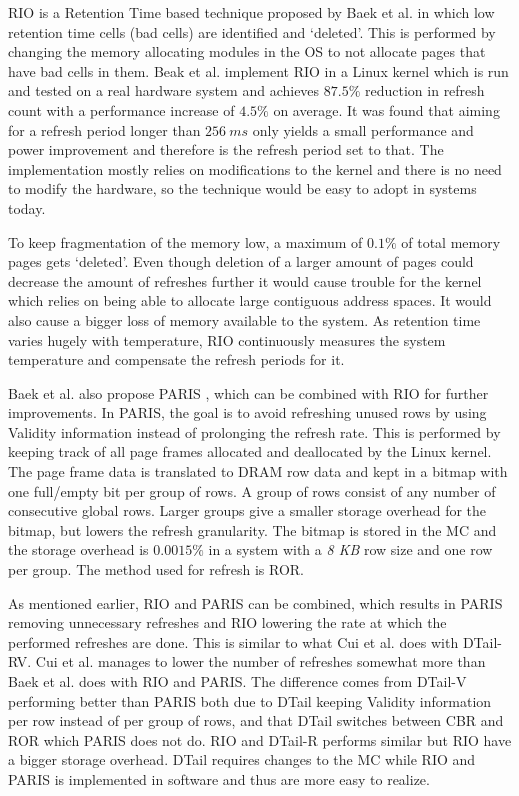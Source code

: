 RIO is a Retention Time based technique proposed by Baek et al. \cite{rioparis} in which low retention time cells (bad cells) are identified and `deleted'. This is performed by changing the memory allocating modules in the OS to not allocate pages that have bad cells in them. Beak et al. implement RIO in a Linux kernel which is run and tested on a real hardware system and achieves $87.5\%$ reduction in refresh count with a performance increase of $4.5\%$ on average. It was found that aiming for a refresh period longer than $256~ms$ only yields a small performance and power improvement and therefore is the refresh period set to that. The implementation mostly relies on modifications to the kernel and there is no need to modify the hardware, so the technique would be easy to adopt in systems today. 

To keep fragmentation of the memory low, a maximum of $0.1\%$ of total memory pages gets `deleted'. Even though deletion of a larger amount of pages could decrease the amount of refreshes further it would cause trouble for the kernel which relies on being able to allocate large contiguous address spaces. It would also cause a bigger loss of memory available to the system. As retention time varies hugely with temperature, RIO continuously measures the system temperature and compensate the refresh periods for it. 

Baek et al. also propose PARIS \cite{rioparis}, which can be combined with RIO for further improvements. In PARIS, the goal is to avoid refreshing unused rows by using Validity information instead of prolonging the refresh rate. This is performed by keeping track of all page frames allocated and deallocated by the Linux kernel. The page frame data is translated to DRAM row data and kept in a bitmap with one full/empty bit per group of rows. A group of rows consist of any number of consecutive global rows. Larger groups give a smaller storage overhead for the bitmap, but lowers the refresh granularity. The bitmap is stored in the MC and the storage overhead is $0.0015\%$ in a system with a \textit{8 KB} row size and one row per group. The method used for refresh is ROR. 

As mentioned earlier, RIO and PARIS can be combined, which results in PARIS removing unnecessary refreshes and RIO lowering the rate at which the performed refreshes are done. This is similar to what Cui et al. does with DTail-RV. Cui et al. manages to lower the number of refreshes somewhat more than Baek et al. does with RIO and PARIS. The difference comes from DTail-V performing better than PARIS both due to DTail keeping Validity information per row instead of per group of rows, and that DTail switches between CBR and ROR which PARIS does not do. RIO and DTail-R performs similar but RIO have a bigger storage overhead. DTail requires changes to the MC while RIO and PARIS is implemented in software and thus are more easy to realize. 